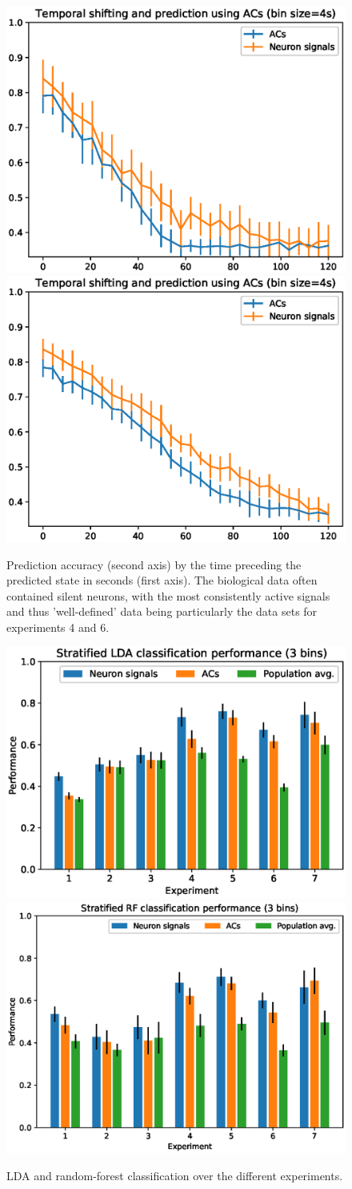 \documentclass[mphil,deptreport,ianc]{infthesis} %
\begin{document}
\begin{figure}
    \centering
    \includegraphics[width=0.49\columnwidth]{figures/LDA/lda_temporal_shifting_and_prediction_bins_4_lda_acs_temporal_windows_4_exp_6.eps}
    \includegraphics[width=0.49\columnwidth]{figures/LDA/lda_temporal_shifting_and_prediction_bins_4_lda_acs_temporal_windows_4_exp_4.eps}
    \caption{Prediction accuracy (second axis) by the time preceding the predicted state in seconds (first axis). The biological data often contained silent neurons, with the most consistently active signals and thus 'well-defined' data being particularly the data sets for experiments 4 and 6.}
    \label{fig:lda_classification}
\end{figure}

\begin{figure}
    \centering
    \includegraphics[width=0.49\columnwidth]{figures/LDA/bars_LDA_per_signal_t_3.eps}
    \includegraphics[width=0.49\columnwidth]{figures/LDA/bars_RF_per_signal_t_3.eps}
    \caption{LDA and random-forest classification over the different experiments.}
    \label{fig:lda_rf_classification}
\end{figure}
\end{document}
